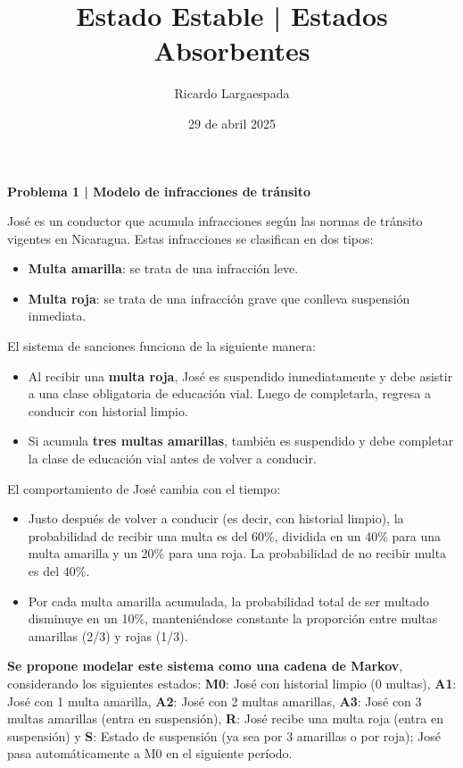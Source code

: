 \documentclass{article}
\title{Estado Estable | Estados Absorbentes}
\author{Ricardo Largaespada}
\date{29 de abril 2025}
\begin{document}
\maketitle

\vspace{-.7cm}
\begin{problem}
\textbf{Problema 1 | Modelo de infracciones de tránsito}

José es un conductor que acumula infracciones según las normas de tránsito vigentes en Nicaragua. Estas infracciones se clasifican en dos tipos:

\begin{itemize}
    \item \textbf{Multa amarilla}: se trata de una infracción leve.
    \item \textbf{Multa roja}: se trata de una infracción grave que conlleva suspensión inmediata.
\end{itemize}

El sistema de sanciones funciona de la siguiente manera:

\begin{itemize}
    \item Al recibir una \textbf{multa roja}, José es suspendido inmediatamente y debe asistir a una clase obligatoria de educación vial. Luego de completarla, regresa a conducir con historial limpio.
    \item Si acumula \textbf{tres multas amarillas}, también es suspendido y debe completar la clase de educación vial antes de volver a conducir.
\end{itemize}

El comportamiento de José cambia con el tiempo:

\begin{itemize}
    \item Justo después de volver a conducir (es decir, con historial limpio), la probabilidad de recibir una multa es del 60\%, dividida en un 40\% para una multa amarilla y un 20\% para una roja. La probabilidad de no recibir multa es del 40\%.
    \item Por cada multa amarilla acumulada, la probabilidad total de ser multado disminuye en un 10\%, manteniéndose constante la proporción entre multas amarillas (2/3) y rojas (1/3).
\end{itemize}

\textbf{Se propone modelar este sistema como una cadena de Markov}, considerando los siguientes estados:  \textbf{M0}: José con historial limpio (0 multas), \textbf{A1}: José con 1 multa amarilla, \textbf{A2}: José con 2 multas amarillas, \textbf{A3}: José con 3 multas amarillas (entra en suspensión), \textbf{R}: José recibe una multa roja (entra en suspensión) y \textbf{S}: Estado de suspensión (ya sea por 3 amarillas o por roja); José pasa automáticamente a M0 en el siguiente período.


\end{problem}
\end{document}

